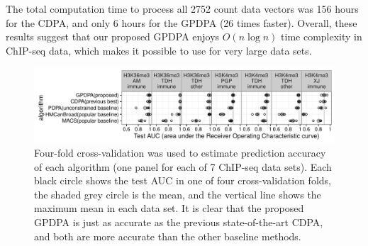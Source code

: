 \documentclass{article}
\begin{document}
The total computation time to process all 2752 count data vectors was
156 hours for the CDPA, and only 6 hours for the GPDPA (26 times
faster). Overall, these results suggest that our proposed GPDPA enjoys
$O(n\log n)$ time complexity in ChIP-seq data, which makes it possible
to use for very large data sets.

\begin{figure}[b!]
  \centering
  \includegraphics[width=\textwidth]{figure-test-error-dots}
  \vskip -0.5cm
  \caption{Four-fold cross-validation was used to estimate prediction
    accuracy of each algorithm (one panel for each of 7 ChIP-seq data sets). 
Each black circle shows the test AUC in one of four
    cross-validation folds, the shaded grey circle is the mean, and
    the vertical line shows the maximum mean in each data set. It is
    clear that the proposed GPDPA is
    just as accurate as the previous state-of-the-art CDPA, and both are
    more accurate than the other baseline methods. 
  }
  \label{fig:test-error-dots}
\end{figure}




\end{document}
